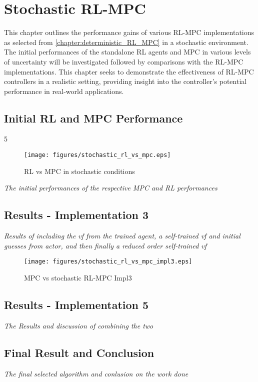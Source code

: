 \chapter{Stochastic RL-MPC}
\label{chapter:stochastic_RL_MPC}

This chapter outlines the performance gains of various RL-MPC implementations as selected from \autoref{chapter:deterministic_RL_MPC} in a stochastic environment. The initial performances of the standalone RL agents and MPC in various levels of uncertainty will be investigated followed by comparisons with the RL-MPC implementations. This chapter seeks to demonstrate the effectiveness of RL-MPC controllers in a realistic setting, providing insight into the controller's potential performance in real-world applications.

\section{Initial RL and MPC Performance}5

\begin{figure}[H]
	\centering
	\texttt{[image: figures/stochastic\_rl\_vs\_mpc.eps]}
	\caption{RL vs MPC in stochastic conditions}
	\label{fig:stochastic-rl-vs-mpc}
\end{figure}

\emph{The initial performances of the respective MPC and RL performances}

\section{Results - Implementation 3}
\emph{Results of including the vf from the trained agent, a self-trained vf and initial guesses from actor, and then finally a reduced order self-trained vf}

\begin{figure}[H]
	\centering
	\texttt{[image: figures/stochastic\_rl\_vs\_mpc\_impl3.eps]}
	\caption{MPC vs stochastic RL-MPC Impl3}
	\label{fig:stochastic-rlmpc-impl3}
\end{figure}



\section{Results - Implementation 5}
\emph{The Results and discussion of combining the two}


\section{Final Result and Conclusion}
\emph{The final selected algorithm and conlusion on the work done}